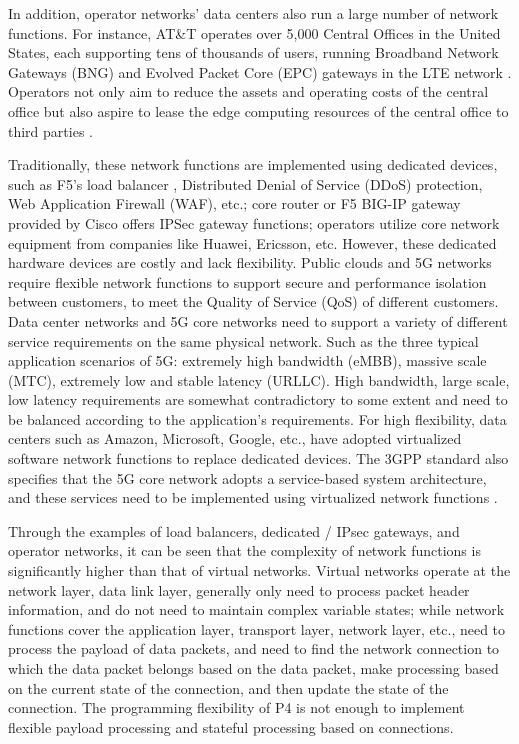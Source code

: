 In addition, operator networks' data centers also run a large number of network functions. For instance, AT&T operates over 5,000 Central Offices in the United States, each supporting tens of thousands of users, running Broadband Network Gateways (BNG) and Evolved Packet Core (EPC) gateways in the LTE network \cite{chang-lan-thesis}. Operators not only aim to reduce the assets and operating costs of the central office but also aspire to lease the edge computing resources of the central office to third parties \cite{chang-lan-thesis}.

Traditionally, these network functions are implemented using dedicated devices, such as F5's load balancer \cite{f5-load-balancer}, Distributed Denial of Service (DDoS) protection, Web Application Firewall (WAF), etc.; core router or F5 BIG-IP gateway provided by Cisco offers IPSec gateway functions; operators utilize core network equipment from companies like Huawei, Ericsson, etc. However, these dedicated hardware devices are costly and lack flexibility. Public clouds and 5G networks require flexible network functions to support secure and performance isolation between customers, to meet the Quality of Service (QoS) of different customers. Data center networks and 5G core networks need to support a variety of different service requirements on the same physical network. Such as the three typical application scenarios of 5G: extremely high bandwidth (eMBB), massive scale (MTC), extremely low and stable latency (URLLC). High bandwidth, large scale, low latency requirements are somewhat contradictory to some extent and need to be balanced according to the application's requirements. For high flexibility, data centers such as Amazon, Microsoft, Google, etc., have adopted virtualized software network functions to replace dedicated devices. The 3GPP standard also specifies that the 5G core network adopts a service-based system architecture, and these services need to be implemented using virtualized network functions \cite{3gpp-23501,3gpp-38300}.

Through the examples of load balancers, dedicated / IPsec gateways, and operator networks, it can be seen that the complexity of network functions is significantly higher than that of virtual networks. Virtual networks operate at the network layer, data link layer, generally only need to process packet header information, and do not need to maintain complex variable states; while network functions cover the application layer, transport layer, network layer, etc., need to process the payload of data packets, and need to find the network connection to which the data packet belongs based on the data packet, make processing based on the current state of the connection, and then update the state of the connection. The programming flexibility of P4 \cite{bosshart2013forwarding} is not enough to implement flexible payload processing and stateful processing based on connections.

